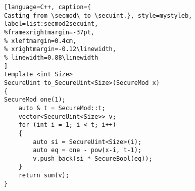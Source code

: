 \begin{figure}[!t]
\begin{minipage}{\linewidth}
\begin{lstlisting}[language=C++, caption={
Casting from \secmod\ to \secuint.}, style=mystyleb, label=list:secmod2secuint,
%framexrightmargin=-37pt,
% xleftmargin=0.4cm,
% xrightmargin=-0.12\linewidth,
% linewidth=0.88\linewidth
]
template <int Size>
SecureUint to_SecureUint<Size>(SecureMod x)
{
SecureMod one(1);
    auto & t = SecureMod::t;
    vector<SecureUint<Size>> v;
    for (int i = 1; i < t; i++)
    {
        auto si = SecureUint<Size>(i);
        auto eq = one - pow(x-i, t-1);
        v.push_back(si * SecureBool(eq));
    }
    return sum(v);
}
\end{lstlisting}
\end{minipage}
\vspace{-0.5cm} 
\end{figure}
